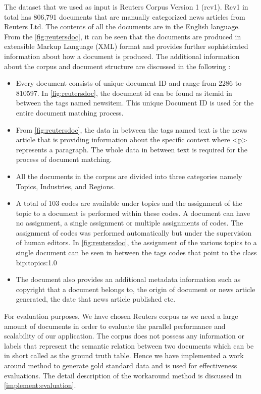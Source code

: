 The dataset that we used as input is Reuters Corpus Version 1 (rcv1). Rcv1 in total has 806,791 documents that are manually categorized news articles from Reuters Ltd. The contents of all the documents are in the English language. From the \ref{fig:reutersdoc}, it can be seen that the documents are produced in extensible Markup Language (XML) format and provides further sophisticated information about how a document is produced. The additional information about the corpus and document structure are discussed in the following \cite{lewis2004rcv1}:
\begin{itemize}
\item Every document consists of unique document ID and range from 2286 to 810597. In \ref{fig:reutersdoc}, the document id can be found as itemid in between the tags named newsitem. This unique Document ID is used for the entire document matching process.

\item From \ref{fig:reutersdoc}, the data in between the tags named text is the news article that is providing information about the specific context where <p> represents a paragraph. The whole data in between text is required for the process of document matching.  

\item  All the documents in the corpus are divided into three categories namely Topics, Industries, and Regions.

\item A total of 103 codes are available under topics and the assignment of the topic to a document is performed within these codes. A document can have no assignment, a single assignment or multiple assignments of codes. The assignment of codes was performed automatically but under the supervision of human editors. In \ref{fig:reutersdoc}, the assignment of the various topics to a single document can be seen in between the tags codes that point to the class bip:topics:1.0

\item The document also provides an additional metadata information such as copyright that a document belongs to, the origin of document or news article generated, the date that news article published etc.
\end{itemize}
  
\par For evaluation purposes, We have chosen Reuters corpus as we need a large amount of documents in order to evaluate the parallel performance and scalability of our application. The corpus does not possess any information or labels that represent the semantic relation between two documents which can be in short called as the ground truth table. Hence we have implemented a work around method to generate gold standard data and is used for effectiveness evaluations. The detail description of the workaround method is discussed in \ref{implement:evaluation}.


